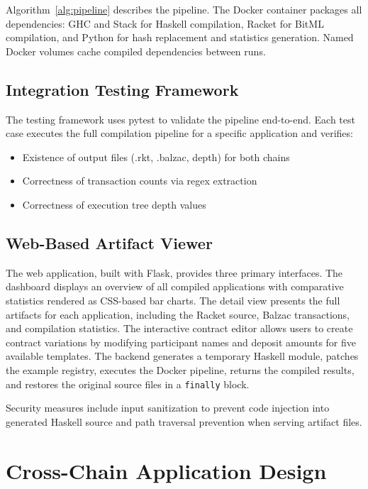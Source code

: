 \documentclass[journal]{IEEEtran}
\begin{document}
Algorithm~\ref{alg:pipeline} describes the pipeline. The Docker container packages all dependencies: GHC and Stack for Haskell compilation, Racket for BitML compilation, and Python for hash replacement and statistics generation. Named Docker volumes cache compiled dependencies between runs.

\subsection{Integration Testing Framework}

The testing framework uses pytest to validate the pipeline end-to-end. Each test case executes the full compilation pipeline for a specific application and verifies:
\begin{itemize}
\item Existence of output files (.rkt, .balzac, depth) for both chains
\item Correctness of transaction counts via regex extraction
\item Correctness of execution tree depth values
\end{itemize}

\subsection{Web-Based Artifact Viewer}

The web application, built with Flask, provides three primary interfaces. The dashboard displays an overview of all compiled applications with comparative statistics rendered as CSS-based bar charts. The detail view presents the full artifacts for each application, including the Racket source, Balzac transactions, and compilation statistics. The interactive contract editor allows users to create contract variations by modifying participant names and deposit amounts for five available templates. The backend generates a temporary Haskell module, patches the example registry, executes the Docker pipeline, returns the compiled results, and restores the original source files in a \texttt{finally} block.

Security measures include input sanitization to prevent code injection into generated Haskell source and path traversal prevention when serving artifact files.

\section{Cross-Chain Application Design}
\end{document}
